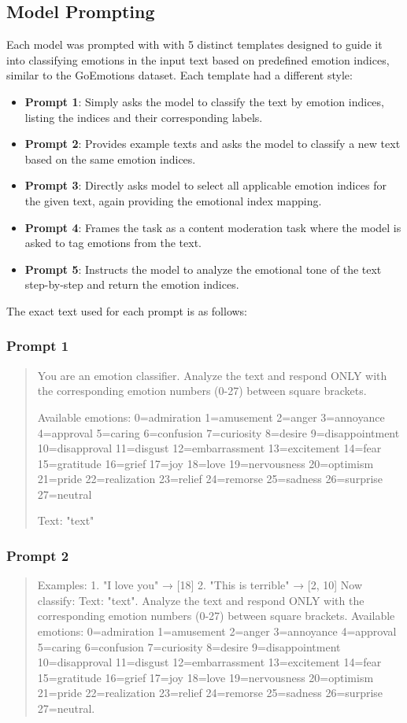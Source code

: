 \documentclass[titlepage]{article}
\begin{document}
\subsection{Model Prompting}
Each model was prompted with with 5 distinct templates designed to guide it into classifying emotions in the input 
text based on predefined emotion indices, similar to the GoEmotions dataset. Each template had a different style:
\begin{itemize}
    \item \textbf{Prompt 1}: Simply asks the model to classify the text by emotion indices, listing the indices and their
    corresponding labels.
    \item \textbf{Prompt 2}: Provides example texts and asks the model to classify a new text based on the same emotion indices.
    \item \textbf{Prompt 3}: Directly asks model to select all applicable emotion indices for the given text, again providing 
    the emotional index mapping.
    \item \textbf{Prompt 4}: Frames the task as a content moderation task where the model is asked to tag emotions from the text.
    \item \textbf{Prompt 5}: Instructs the model to analyze the emotional tone of the text step-by-step and return the emotion indices.
\end{itemize}

The exact text used for each prompt is as follows:
\subsubsection{Prompt 1}
\begin{quote}
    You are an emotion classifier. Analyze the text and respond ONLY with the corresponding emotion numbers (0-27) between square brackets.
    
    Available emotions:
    0=admiration 1=amusement 2=anger 3=annoyance 4=approval
    5=caring 6=confusion 7=curiosity 8=desire 9=disappointment
    10=disapproval 11=disgust 12=embarrassment 13=excitement
    14=fear 15=gratitude 16=grief 17=joy 18=love
    19=nervousness 20=optimism 21=pride 22=realization
    23=relief 24=remorse 25=sadness 26=surprise 27=neutral

    Text: "{text}"
\end{quote}

\subsubsection{Prompt 2}
\begin{quote}
    Examples:
        1. "I love you" → [18]
        2. "This is terrible" → [2, 10]
        Now classify:
    Text: "{text}". Analyze the text and respond ONLY with the corresponding emotion numbers (0-27) between square brackets.
    Available emotions:
    0=admiration 1=amusement 2=anger 3=annoyance 4=approval 5=caring 6=confusion 7=curiosity 8=desire 9=disappointment 10=disapproval 
    11=disgust 12=embarrassment 13=excitement 14=fear 15=gratitude 16=grief 17=joy 18=love 19=nervousness 20=optimism 21=pride 
    22=realization 23=relief 24=remorse 25=sadness 26=surprise 27=neutral.
\end{quote}
\end{document}
